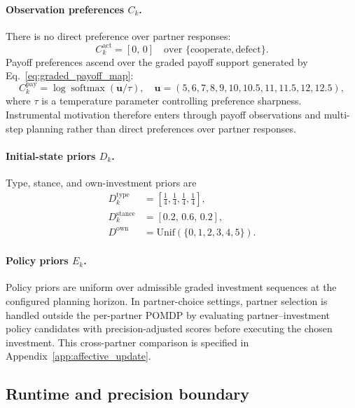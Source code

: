 \paragraph{Observation preferences \(C_k\).}
There is no direct preference over partner responses:
\begin{equation}
C_k^{\mathrm{act}} = [0,\,0] \quad \text{over } \{\mathrm{cooperate},\mathrm{defect}\}.
\label{eq:c_act}
\end{equation}
Payoff preferences ascend over the graded payoff support generated by Eq.~\eqref{eq:graded_payoff_map}:
\begin{equation}
C_k^{\mathrm{pay}} = \log \operatorname{softmax}\!\left(\mathbf{u}/\tau\right),
\quad \mathbf{u}=(5,6,7,8,9,10,10.5,11,11.5,12,12.5),
\label{eq:c_pay}
\end{equation}
where $\tau$ is a temperature parameter controlling preference sharpness. Instrumental motivation therefore enters through payoff observations and multi-step planning rather than direct preferences over partner responses.

\paragraph{Initial-state priors \(D_k\).}
Type, stance, and own-investment priors are
\begin{align}
D_k^{\mathrm{type}} &= \left[\tfrac{1}{4},\tfrac{1}{4},\tfrac{1}{4},\tfrac{1}{4}\right], \label{eq:d_type}\\
D_k^{\mathrm{stance}} &= [0.2,\,0.6,\,0.2], \label{eq:d_stance}\\
D^{\mathrm{own}} &= \mathrm{Unif}(\{0,1,2,3,4,5\}). \label{eq:d_own}
\end{align}

\paragraph{Policy priors \(E_k\).}
Policy priors are uniform over admissible graded investment sequences at the configured planning horizon. In partner-choice settings, partner selection is handled outside the per-partner POMDP by evaluating partner--investment policy candidates with precision-adjusted scores before executing the chosen investment. This cross-partner comparison is specified in Appendix~\ref{app:affective_update}.

\subsection{Runtime and precision boundary}
\label{app:pomdp_beta_auxiliary}

